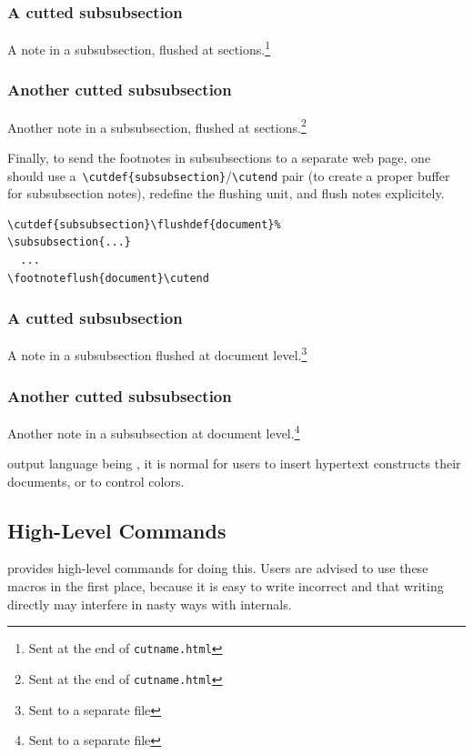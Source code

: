 \subsubsection{A cutted subsubsection}
A note in a subsubsection, flushed at sections.\footnote{Sent at
the end of \texttt{cutname.html}}
\subsubsection{Another cutted subsubsection}
Another note in a subsubsection, flushed at sections.\footnote{Sent at
the end of \texttt{cutname.html}}
\cutend*

Finally, to send the footnotes in subsubsections
to a separate web page, one should use
a~\verb+\cutdef{subsubsection}+/\verb+\cutend+ pair
(to create a proper buffer for subsubsection notes),
redefine the flushing unit, and flush notes explicitely.
\begin{verbatim}
\cutdef{subsubsection}\flushdef{document}%
\subsubsection{...}
  ...
\footnoteflush{document}\cutend
\end{verbatim}

\subsubsection{A cutted subsubsection}
A note in a subsubsection flushed at document level.\footnote{Sent to a
separate file}
\subsubsection{Another cutted subsubsection}
Another note in a subsubsection at document level.\footnote{Sent to
a separate file}
%
\cutend
\fi

\hevea{} output language being \html{}, it is normal for users to insert
hypertext constructs their documents, or to control colors.

\subsection{High-Level Commands}
\hevea{} provides high-level commands for doing this.
Users are advised to use these macros in the first place,
because it is easy to write incorrect \html{} and that writing
\html{} directly may interfere in nasty ways with \hevea{} internals.


